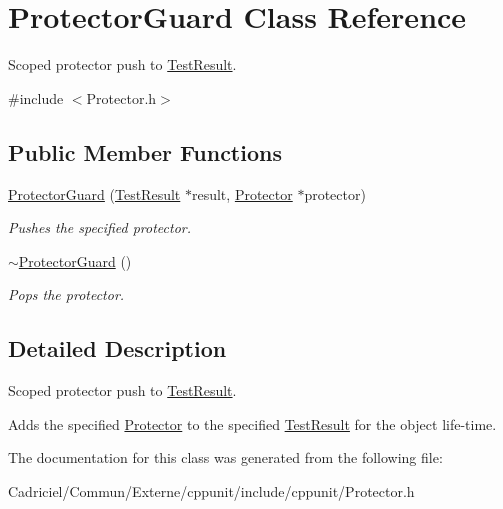 \hypertarget{class_protector_guard}{}\section{Protector\+Guard Class Reference}
\label{class_protector_guard}


Scoped protector push to \hyperlink{class_test_result}{Test\+Result}.  




{\ttfamily \#include $<$Protector.\+h$>$}

\subsection*{Public Member Functions}
\begin{DoxyCompactItemize}
\item 
\hyperlink{class_protector_guard_abc4a3b2b51b6d93fb3dd9fed1bbc85db}{Protector\+Guard} (\hyperlink{class_test_result}{Test\+Result} $\ast$result, \hyperlink{class_protector}{Protector} $\ast$protector)\hypertarget{class_protector_guard_abc4a3b2b51b6d93fb3dd9fed1bbc85db}{}\label{class_protector_guard_abc4a3b2b51b6d93fb3dd9fed1bbc85db}

\begin{DoxyCompactList}\small\item\em Pushes the specified protector. \end{DoxyCompactList}\item 
\hyperlink{class_protector_guard_af80b574cc5999746e77ec13d2d0093f5}{$\sim$\+Protector\+Guard} ()\hypertarget{class_protector_guard_af80b574cc5999746e77ec13d2d0093f5}{}\label{class_protector_guard_af80b574cc5999746e77ec13d2d0093f5}

\begin{DoxyCompactList}\small\item\em Pops the protector. \end{DoxyCompactList}\end{DoxyCompactItemize}


\subsection{Detailed Description}
Scoped protector push to \hyperlink{class_test_result}{Test\+Result}. 

Adds the specified \hyperlink{class_protector}{Protector} to the specified \hyperlink{class_test_result}{Test\+Result} for the object life-\/time. 

The documentation for this class was generated from the following file\+:\begin{DoxyCompactItemize}
\item 
Cadriciel/\+Commun/\+Externe/cppunit/include/cppunit/Protector.\+h\end{DoxyCompactItemize}
